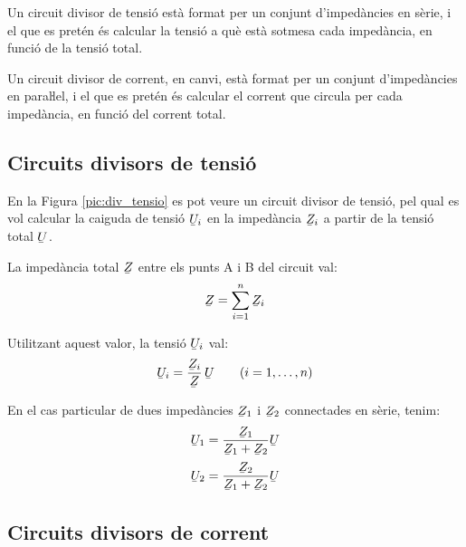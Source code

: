 Un circuit divisor de tensió està format per un conjunt
d'impedàncies en sèrie, i el que es pretén és calcular la
tensió a què està sotmesa cada impedància, en funció de la tensió total.

Un circuit divisor de corrent, en canvi, està format per un conjunt
d'impedàncies en paraŀlel, i el que es pretén és calcular el
corrent que circula per cada impedància, en funció del corrent
total.

\subsection{Circuits divisors de tensió}\label{sec:circ-div-tens}

En la Figura \vref{pic:div_tensio} es pot veure un circuit divisor
de tensió, pel qual es vol calcular la caiguda de tensió
$\cmplx{U}_i$ en la impedància $\cmplx{Z}_i$ a partir de la tensió total $\cmplx{U}$.

\begin{center}
\centering
    
    \label{pic:div_tensio}
\end{center}

La impedància total $\cmplx{Z}$ entre els punts A i B del circuit val:
\begin{equation}\label{eq:z_serie}
    \cmplx{Z} = \sum_{i=1}^n \cmplx{Z}_i
\end{equation}

Utilitzant aquest valor, la tensió $\cmplx{U}_i$ val:
\begin{equation}
    \cmplx{U}_i = \frac{\cmplx{Z}_i}{\cmplx{Z}}\,\cmplx{U}\qquad (i=1,\dots,n)\label{eq:div_tensio}
\end{equation}

En el cas particular de dues impedàncies $\cmplx{Z}_1$ i $\cmplx{Z}_2$ connectades en sèrie, tenim:
\begin{subequations}
\begin{align}
    \cmplx{U}_1 &= \frac{\cmplx{Z}_1}{\cmplx{Z}_1+\cmplx{Z}_2} \cmplx{U}  \\[0.5ex]
    \cmplx{U}_2 &= \frac{\cmplx{Z}_2}{\cmplx{Z}_1+\cmplx{Z}_2} \cmplx{U}
\end{align}
\end{subequations}

\subsection{Circuits divisors de corrent}\label{sec:circ-div-corr}


